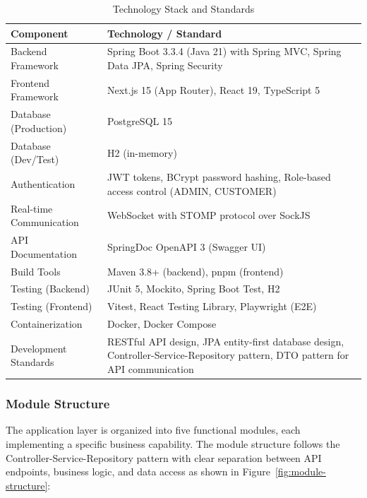\begin{table}[h]
    \centering
    \caption{Technology Stack and Standards}
    \label{tab:tech-stack}
    \small
    \begin{tabular}{|p{3.5cm}|p{9cm}|}
        \hline
        \textbf{Component} & \textbf{Technology / Standard} \\
        \hline
        Backend Framework & Spring Boot 3.3.4 (Java 21) with Spring MVC, Spring Data JPA, Spring Security \\
        \hline
        Frontend Framework & Next.js 15 (App Router), React 19, TypeScript 5 \\
        \hline
        Database (Production) & PostgreSQL 15 \\
        \hline
        Database (Dev/Test) & H2 (in-memory) \\
        \hline
        Authentication & JWT tokens, BCrypt password hashing, Role-based access control (ADMIN, CUSTOMER) \\
        \hline
        Real-time Communication & WebSocket with STOMP protocol over SockJS \\
        \hline
        API Documentation & SpringDoc OpenAPI 3 (Swagger UI) \\
        \hline
        Build Tools & Maven 3.8+ (backend), pnpm (frontend) \\
        \hline
        Testing (Backend) & JUnit 5, Mockito, Spring Boot Test, H2 \\
        \hline
        Testing (Frontend) & Vitest, React Testing Library, Playwright (E2E) \\
        \hline
        Containerization & Docker, Docker Compose \\
        \hline
        Development Standards & RESTful API design, JPA entity-first database design, Controller-Service-Repository pattern, DTO pattern for API communication \\
        \hline
    \end{tabular}
\end{table}

\subsubsection{Module Structure}
\label{subsubsec:module-structure}

The application layer is organized into five functional modules, each implementing a specific business capability. The module structure follows the Controller-Service-Repository pattern with clear separation between API endpoints, business logic, and data access as shown in Figure~\ref{fig:module-structure}:

